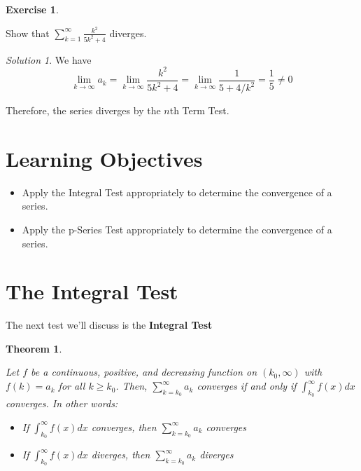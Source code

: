 \documentclass[
]{book}
\providecommand{\tightlist}{%
  \setlength{\itemsep}{0pt}\setlength{\parskip}{0pt}}
\newtheorem{theorem}{Theorem}[chapter]
\theoremstyle{definition}
\theoremstyle{definition}
\theoremstyle{definition}
\newtheorem{exercise}{Exercise}[chapter]
\theoremstyle{definition}
\theoremstyle{remark}
\newtheorem*{solution}{Solution}
\begin{document}
\begin{exercise}
\protect\hypertarget{exr:unlabeled-div-187}{}\label{exr:unlabeled-div-187}

Show that \(\displaystyle \sum_{k=1}^\infty \frac{k^2}{5k^2+4}\) diverges.

\end{exercise}

\begin{solution}

We have \[\lim_{k\to\infty}a_k = \lim_{k\to\infty}\frac{k^2}{5k^2+4}=\lim_{k\to\infty}\frac{1}{5+4/k^2}=\frac{1}{5}\neq 0\]

Therefore, the series diverges by the \(n\)th Term Test.

\end{solution}

\hypertarget{learning-objectives-26}{%
\section{Learning Objectives}\label{learning-objectives-26}}

\begin{itemize}
\tightlist
\item
  Apply the Integral Test appropriately to determine the convergence of a series.
\item
  Apply the p-Series Test appropriately to determine the convergence of a series.
\end{itemize}

\hypertarget{the-integral-test}{%
\section{The Integral Test}\label{the-integral-test}}

The next test we'll discuss is the \textbf{Integral Test}

\begin{theorem}
\protect\hypertarget{thm:unlabeled-div-189}{}\label{thm:unlabeled-div-189}

Let \(f\) be a continuous, positive, and decreasing function on \((k_0,\infty)\) with \(f(k)=a_k\) for all \(k\geq k_0\). Then, \(\displaystyle \sum_{k=k_0}^\infty a_k\) converges if and only if \(\displaystyle \int_{k_0}^\infty f(x)dx\) converges. In other words:

\begin{itemize}
\tightlist
\item
  If \(\displaystyle \int_{k_0}^\infty f(x)dx\) converges, then \(\displaystyle \sum_{k=k_0}^\infty a_k\) converges
\item
  If \(\displaystyle \int_{k_0}^\infty f(x)dx\) diverges, then \(\displaystyle \sum_{k=k_0}^\infty a_k\) diverges
\end{itemize}

\end{theorem}
\end{document}
